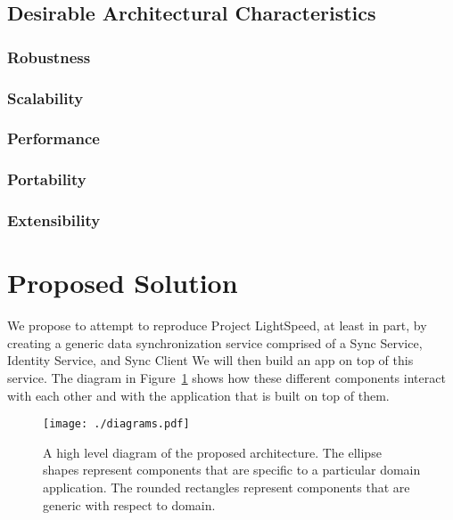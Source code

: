 \documentclass[12pt]{article}
\begin{document}
        \subsection{Desirable Architectural Characteristics}
            \subsubsection{Robustness}
            \subsubsection{Scalability}
            \subsubsection{Performance}
            \subsubsection{Portability}
            \subsubsection{Extensibility}

    \section{Proposed Solution}
    We propose to attempt to reproduce Project LightSpeed, at least in part, by creating a generic data synchronization service comprised of a Sync Service, Identity Service, and Sync Client We will then build an app on top of this service.
    The diagram in Figure~\ref{fig:high-level} shows how these different components interact with each other and with the application that is built on top of them.

    \begin{figure}
        \centering
        \texttt{[image: ./diagrams.pdf]}
        \caption{A high level diagram of the proposed architecture. The ellipse shapes represent components that are specific to a particular domain application. The rounded rectangles represent components that are generic with respect to domain. \label{fig:high-level}}
    \end{figure}
\end{document}
